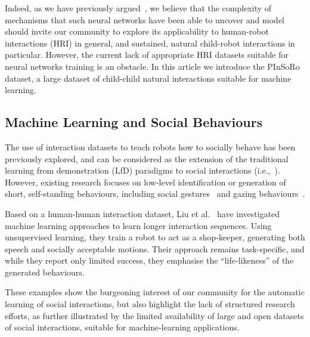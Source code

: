 \documentclass{article}
\newcommand{\etal}{et al.\xspace}
\begin{document}
Indeed, as we have previously argued~\cite{lemaignan2016towards}, we believe
that the complexity of mechanisms that such neural networks have been able to
uncover and model should invite our community to explore its applicability to
human-robot interactions (HRI) in general, and sustained, natural child-robot
interactions in particular. However, the current lack of appropriate HRI
datasets suitable for neural networks training is an obstacle. In this article we introduce the PInSoRo dataset, a large dataset of child-child
natural interactions suitable for machine learning.

\subsection*{Machine Learning and Social Behaviours}

The use of interaction datasets to teach robots how to socially behave has been
previously explored, and can be considered as the extension of the traditional
learning from demonstration (LfD) paradigms to social interactions (i.e.,~\cite{nehaniv2007imitation,mohammad2015interaction}). However, existing
research focuses on low-level identification or generation of short,
self-standing behaviours, including social gestures~\cite{nagai2005learning}
and gazing behaviours~\cite{calinon2006teaching}.

Based on a human-human interaction dataset, Liu \etal~\cite{liu2014how} have
investigated machine learning approaches to learn longer interaction sequences.
Using unsupervised learning, they train a robot to act as a shop-keeper,
generating both speech and socially acceptable motions. Their approach remains
task-specific, and while they report only limited success, they emphasise the
``life-likeness'' of the generated behaviours.

These examples show the burgeoning interest of our community for the automatic
learning of social interactions, but also highlight the lack of structured
research efforts, as further illustrated by the limited availability of large
and open datasets of social interactions, suitable for machine-learning
applications.
\end{document}

